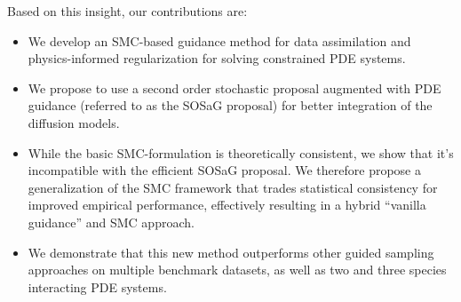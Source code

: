 Based on this insight, our contributions are:
\begin{itemize}
    \item We develop an SMC-based guidance method for data assimilation and physics-informed regularization for solving constrained PDE systems.
    \item We propose to use a second order stochastic proposal augmented with PDE guidance (referred to as the SOSaG proposal) for better integration of the diffusion models.
    \item While the basic SMC-formulation is theoretically consistent, we show that it's incompatible with the efficient SOSaG proposal. We therefore propose a generalization of the SMC framework that trades statistical consistency for improved empirical performance, effectively resulting in a hybrid ``vanilla guidance'' and SMC approach. 
    \item We demonstrate that this new method outperforms other guided sampling approaches \citep{huang2024diffusionpdegenerativepdesolvingpartial} on multiple benchmark datasets, as well as two and three species interacting PDE systems. 
\end{itemize}

